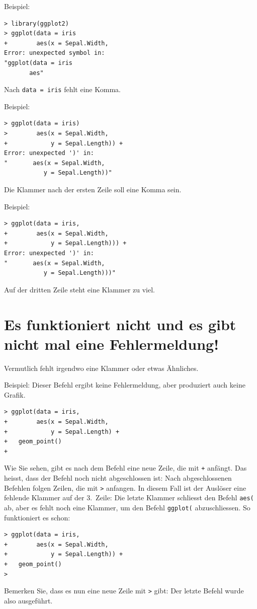 \documentclass[oneside, 10pt]{book}\usepackage[]{graphicx}\usepackage[]{xcolor}
\begin{document}
Beispiel:
\begin{verbatim}
> library(ggplot2)
> ggplot(data = iris
+        aes(x = Sepal.Width,
Error: unexpected symbol in:
"ggplot(data = iris
       aes"
\end{verbatim}
Nach \texttt{data = iris} fehlt eine Komma.

Beispiel:
\begin{verbatim}
> ggplot(data = iris)
>        aes(x = Sepal.Width,
+            y = Sepal.Length)) +
Error: unexpected ')' in:
"       aes(x = Sepal.Width,
           y = Sepal.Length))"
\end{verbatim}
Die Klammer nach der ersten Zeile soll eine Komma sein.

Beispiel:
\begin{verbatim}
> ggplot(data = iris,
+        aes(x = Sepal.Width,
+            y = Sepal.Length))) +
Error: unexpected ')' in:
"       aes(x = Sepal.Width,
           y = Sepal.Length)))"
\end{verbatim}

Auf der dritten Zeile steht eine Klammer zu viel.

\section*{Es funktioniert nicht und es gibt nicht mal eine Fehlermeldung!}
Vermutlich fehlt irgendwo eine Klammer oder etwas Ähnliches.

Beispiel: Dieser Befehl ergibt keine Fehlermeldung, aber produziert auch keine Grafik.
\begin{verbatim}
> ggplot(data = iris,
+        aes(x = Sepal.Width,
+            y = Sepal.Length) +
+   geom_point()
+
\end{verbatim}

Wie Sie sehen, gibt es nach dem Befehl eine neue Zeile, die mit \texttt{+} anfängt. Das heisst, dass der Befehl noch nicht abgeschlossen ist: Nach abgeschlossenen Befehlen folgen Zeilen, die mit \texttt{>} anfangen. In diesem Fall ist der Auslöser eine fehlende Klammer auf der 3.\ Zeile: Die letzte Klammer schliesst den Befehl \texttt{aes(} ab, aber es fehlt noch eine Klammer, um den Befehl \texttt{ggplot(} abzuschliessen. So funktioniert es schon:
\begin{verbatim}
> ggplot(data = iris,
+        aes(x = Sepal.Width,
+            y = Sepal.Length)) +
+   geom_point()
>
\end{verbatim}

Bemerken Sie, dass es nun eine neue Zeile mit \texttt{>} gibt: Der letzte Befehl wurde also ausgeführt.
\end{document}
